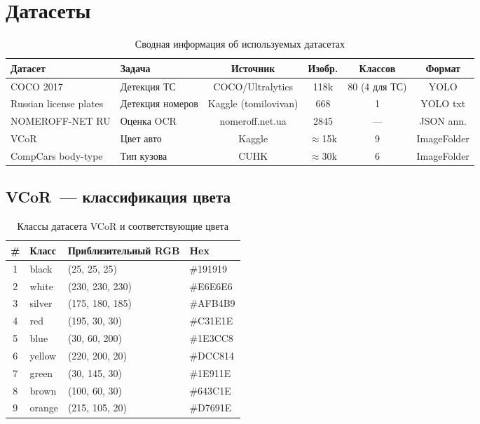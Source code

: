 \documentclass[10pt,a4paper]{report}
\numberwithin{equation}{chapter}
\numberwithin{figure}{chapter}
\numberwithin{table}{chapter}
\begin{document}
\section{Датасеты}

\begin{table}[H]
\centering
\caption{Сводная информация об используемых датасетах}
\label{tab:datasets_summary}
\begin{tabularx}{\textwidth}{lXcccc}
\toprule
\textbf{Датасет} & \textbf{Задача} & \textbf{Источник} & \textbf{Изобр.} & \textbf{Классов} & \textbf{Формат} \\
\midrule
COCO 2017          & Детекция ТС        & COCO/Ultralytics & 118k & 80 (4 для ТС) & YOLO \\
Russian license plates & Детекция номеров & Kaggle (tomilovivan) & 668 & 1 & YOLO txt \\
NOMEROFF-NET RU    & Оценка OCR         & nomeroff.net.ua  & 2845 & --- & JSON ann. \\
VCoR               & Цвет авто          & Kaggle           & $\approx$15k & 9 & ImageFolder \\
CompCars body-type & Тип кузова         & CUHK             & $\approx$30k & 6 & ImageFolder \\
\bottomrule
\end{tabularx}
\end{table}

\subsection{VCoR~--- классификация цвета}

\begin{table}[H]
\centering
\caption{Классы датасета VCoR и соответствующие цвета}
\label{tab:vcor}
\begin{tabular}{clll}
\toprule
\textbf{\#} & \textbf{Класс} & \textbf{Приблизительный RGB} & \textbf{Hex} \\
\midrule
1 & black  & (25, 25, 25)   & \#191919 \\
2 & white  & (230, 230, 230)& \#E6E6E6 \\
3 & silver & (175, 180, 185)& \#AFB4B9 \\
4 & red    & (195, 30, 30)  & \#C31E1E \\
5 & blue   & (30, 60, 200)  & \#1E3CC8 \\
6 & yellow & (220, 200, 20) & \#DCC814 \\
7 & green  & (30, 145, 30)  & \#1E911E \\
8 & brown  & (100, 60, 30)  & \#643C1E \\
9 & orange & (215, 105, 20) & \#D7691E \\
\bottomrule
\end{tabular}
\end{table}
\end{document}
